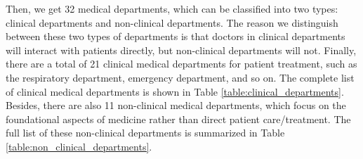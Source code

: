 \documentclass[fleqn,12pt]{wlscirep}
\begin{document}
Then, we get 32 medical departments, which can be classified into two types: clinical departments and non-clinical departments. The reason we distinguish between these two types of departments is that doctors in clinical departments will interact with patients directly, but non-clinical departments will not. 
Finally, there are a total of 21 clinical medical departments for patient treatment, such as the respiratory department, emergency department, and so on. The complete list of clinical medical departments is shown in Table \ref{table:clinical_departments}. 
Besides, there are also 11 non-clinical medical departments, which focus on the foundational aspects of medicine rather than direct patient care/treatment. The full list of these non-clinical departments is summarized in Table \ref{table:non_clinical_departments}. 
\end{document}
